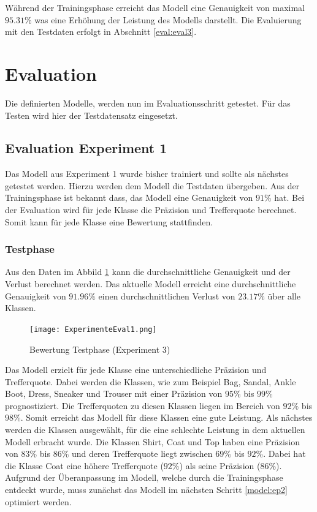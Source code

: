 \documentclass[12pt]{scrreprt}
\begin{document}
Während der Trainingsphase erreicht das Modell eine Genauigkeit von maximal $95.31\%$ was eine Erhöhung der Leistung des Modells darstellt. Die Evaluierung mit den Testdaten erfolgt in Abschnitt \ref{eval:eval3}.

\section{Evaluation}\label{eval:eval}

Die definierten Modelle, werden nun im Evaluationsschritt getestet. Für das Testen wird hier der Testdatensatz eingesetzt.

\subsection{Evaluation Experiment 1}\label{eval:eval1}

Das Modell aus Experiment 1 wurde bisher trainiert und sollte als nächstes getestet werden. Hierzu werden dem Modell die Testdaten übergeben. Aus der Trainingsphase ist bekannt dass, das Modell eine Genauigkeit von $91\%$ hat. Bei der Evaluation wird für jede Klasse die Präzision und Trefferquote berechnet. Somit kann für jede Klasse eine Bewertung stattfinden.

\subsubsection{Testphase}

Aus den Daten im Abbild \ref{fig:fig18} kann die durchschnittliche Genauigkeit und der Verlust berechnet werden. Das aktuelle Modell erreicht eine durchschnittliche Genauigkeit von $91.96\%$ einen durchschnittlichen Verlust von $23.17\%$  über alle Klassen. \\

\begin{figure}[h!]
	\centering
	\texttt{[image: ExperimenteEval1.png]}
	\caption{ Bewertung Testphase \cite{HK22}(Experiment 3)}
	\label{fig:fig18}
\end{figure}

Das Modell erzielt für jede Klasse eine unterschiedliche Präzision und Trefferquote. Dabei werden die Klassen, wie zum Beispiel Bag, Sandal, Ankle Boot, Dress, Sneaker und Trouser mit einer Präzision von $95\%$ bis $99\%$ prognostiziert. Die Trefferquoten zu diesen Klassen liegen im Bereich von $92\%$ bis $98\%$. Somit erreicht das Modell für diese Klassen eine gute Leistung. Als nächstes werden die Klassen ausgewählt, für die eine schlechte Leistung in dem aktuellen Modell erbracht wurde. Die Klassen Shirt, Coat und Top haben eine Präzision von $83\%$ bis $86\%$ und deren Trefferquote liegt zwischen $69\%$ bis $92\%$. Dabei hat die Klasse Coat eine höhere Trefferquote ($92\%$)  als seine Präzision ($86\%$). Aufgrund der Überanpassung im Modell, welche durch die Trainingsphase entdeckt wurde, muss zunächst das Modell im nächsten Schritt \ref{model:ep2} optimiert werden.
\end{document}
